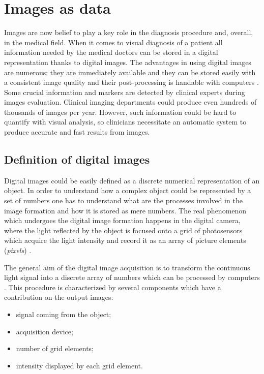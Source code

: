 \documentclass[../main.tex]{subfiles}
\begin{document}
\section{Images as data}
Images are now belief to play a key role in the diagnosis procedure and, overall, in the medical field. When it comes to visual diagnosis of a patient all information needed by the medical doctors can be stored in a digital representation thanks to digital images. 
The advantages in using digital images are numerous: they are immediately available and they can be stored easily with a consistent image quality and their post-processing is handable with computers \cite{journal_of_dermatology}.  
Some crucial information and markers are detected by clinical experts during images evaluation.
Clinical imaging departments could produce even hundreds of thousands of images per year\cite{info_in_images}. However, such information could be hard to quantify with visual analysis, so clinicians necessitate an automatic system to produce accurate and fast results from images.

\subsection{Definition of digital images}\label{sec:definition-of-images}

Digital images could be easily defined as a discrete numerical representation of an object. In order to understand how a complex object could be represented by a set of numbers one has to understand what are the processes involved in the image formation and how it is stored as mere numbers.
The real phenomenon which undergoes the digital image formation happens in the digital camera, where the light reflected by the object is focused onto a grid of photosensors which acquire the light intensity and record it as an array of picture elements (\textit{pixels}) \cite{bourne2010fundamentals}.

The general aim of the digital image acquisition is to transform the continuous light signal into a discrete array of numbers which can be processed by computers \cite{image_acquisition_article}. This procedure is characterized by several components which have a contribution on the output images:

\begin{itemize}
    \item signal coming from the object;
    \item acquisition device;
    \item number of grid elements;
    \item intensity displayed by each grid element.
\end{itemize}
\end{document}
